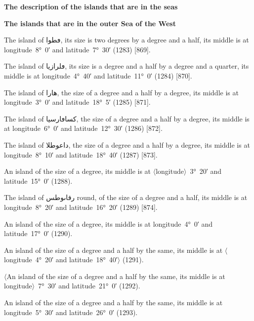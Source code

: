 \documentclass[11pt]{article}
\newcommand{\Pg}[1]{\marginpar{\footnotesize #1}}
\newcommand{\Ang}[1]{\ensuremath{#1}}
\begin{document}
\par\medskip\begin{center}\Pg{p. 84}\bfseries The description of the islands that are in the seas\end{center}\par

\par\medskip\begin{center}\bfseries The islands that are in the outer Sea of the West\end{center}\par

The island of \textarabic{ڡطوا}, its size is two degrees by a degree and a half, its middle is at longitude~8°~0′ and latitude~7°~30′ (1283) [869].

The island of \textarabic{ڡلرازيا}, its size is a degree and a half by a degree and a quarter, its middle is at longitude~4°~40′ and latitude~11°~0′ (1284) [870].

The island of \textarabic{هارا}, the size of a degree and a half by a degree, its middle is at longitude~3°~0′ and latitude~18°~5′ (1285) [871].

The island of \textarabic{كساڡارسيا}, the size of a degree and a half by a degree, its middle is at longitude~6°~0′ and latitude~12°~30′ (1286) [872].

The island of \textarabic{داعوطلا}, the size of a degree and a half by a degree, its middle is at longitude~8°~10′ and latitude~18°~40′ (1287) [873].

An island of the size of a degree, its middle is at \Ang{\langle}longitude\Ang{\rangle}~3°~20′ and latitude~15°~0′ (1288).

The island of \textarabic{رفاٮوطس} round, of the size of a degree and a half, its middle is at longitude~8°~20′ and latitude~16°~20′ (1289) [874].

An island of the size of a degree, its middle is at longitude~4°~0′ and latitude~17°~0′ (1290).

An island of the size of a degree and a half by the same, its middle is at \Ang{\langle}longitude~4°~20′ and latitude~18°~40′\Ang{\rangle} (1291).

\Ang{\langle}An island of the size of a degree and a half by the same, its middle is at longitude\Ang{\rangle}~7°~30′ and latitude~21°~0′ (1292).

An island of the size of a degree and a half by the same, its middle is at longitude~5°~30′ and latitude~26°~0′ (1293).
\end{document}
